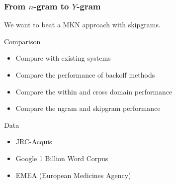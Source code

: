 \begin{frame}
    \frametitle{From $n$-gram to $Y$-gram}

    We want to beat a MKN approach with skipgrams.

    \begin{block}{Comparison}
        \begin{itemize}
            \item Compare with existing systems
            \item Compare the performance of backoff methods
            \item Compare the within and cross domain performance
            \item Compare the ngram and skipgram performance
        \end{itemize}
    \end{block}

    \begin{block}{Data}
        \begin{itemize}
            \item JRC-Acquis
            \item Google 1 Billion Word Corpus
            \item EMEA (European Medicines Agency)
        \end{itemize}
    \end{block}

\end{frame}

